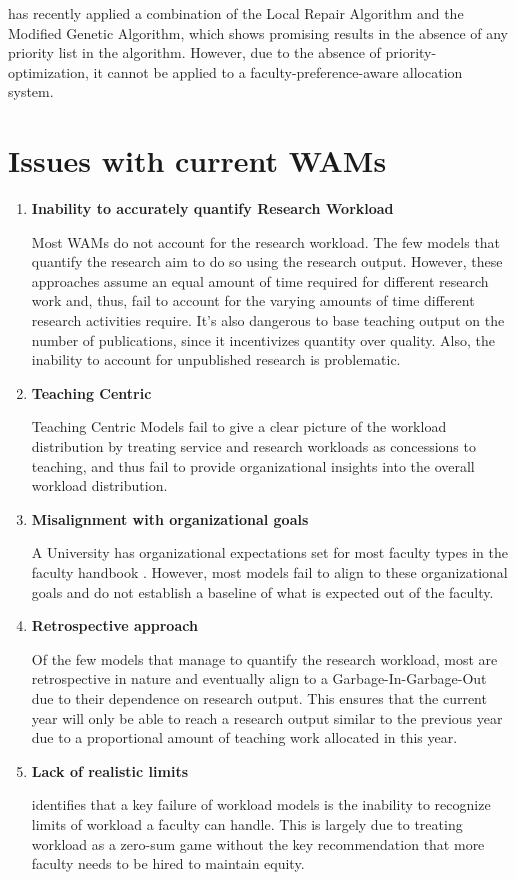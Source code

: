 \cite{dofadar2021hybrid} has recently applied a combination of the Local Repair Algorithm and the Modified Genetic Algorithm, which shows promising results in the absence of any priority list in the algorithm. However, due to the absence of priority-optimization, it cannot be applied to a faculty-preference-aware allocation system.

\section{Issues with current WAMs}

\begin{enumerate}

    \item \textbf{Inability to accurately quantify Research Workload}

          Most WAMs do not account for the research workload. The few models that quantify the research aim to do so using the research output. However, these approaches assume an equal amount of time required for different research work and, thus, fail to account for the varying amounts of time different research activities require. It's also dangerous to base teaching output on the number of publications, since it incentivizes quantity over quality. Also, the inability to account for unpublished research is problematic.

    \item \textbf{Teaching Centric}

          Teaching Centric Models fail to give a clear picture of the workload distribution by treating service and research workloads as concessions to teaching, and thus fail to provide organizational insights into the overall workload distribution. \cite{rohan2017}

    \item \textbf{Misalignment with organizational goals}

          A University has organizational expectations set for most faculty types in the faculty handbook \cite{griffith2020framework}. However, most models fail to align to these organizational goals and do not establish a baseline of what is expected out of the faculty.

    \item \textbf{Retrospective approach}

          Of the few models that manage to quantify the research workload, most are retrospective in nature and eventually align to a Garbage-In-Garbage-Out due to their dependence on research output. This ensures that the current year will only be able to reach a research output similar to the previous year due to a proportional amount of teaching work allocated in this year.

    \item \textbf{Lack of realistic limits}

          \cite{vardi2009impacts} identifies that a key failure of workload models is the inability to recognize limits of workload a faculty can handle. This is largely due to treating workload as a zero-sum game without the key recommendation that more faculty needs to be hired to maintain equity.
\end{enumerate}


